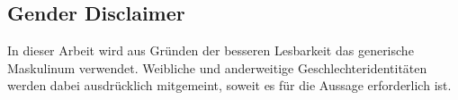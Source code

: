 \begin{center}
	\section*{Gender Disclaimer}
\end{center}
In dieser Arbeit wird aus Gründen der besseren Lesbarkeit das generische Maskulinum verwendet. Weibliche und anderweitige Geschlechteridentitäten werden dabei
ausdrücklich mitgemeint, soweit es für die Aussage erforderlich ist.